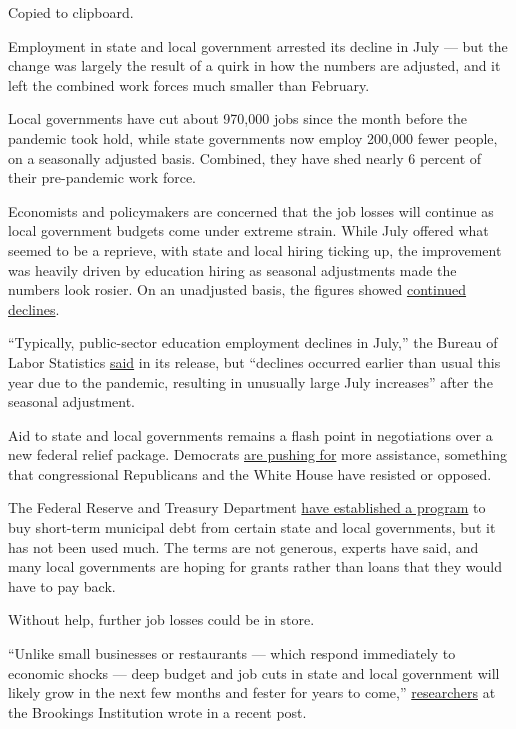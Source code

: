 Copied to clipboard.

Employment in state and local government arrested its decline in July
--- but the change was largely the result of a quirk in how the numbers
are adjusted, and it left the combined work forces much smaller than
February.

Local governments have cut about 970,000 jobs since the month before the
pandemic took hold, while state governments now employ 200,000 fewer
people, on a seasonally adjusted basis. Combined, they have shed nearly
6 percent of their pre-pandemic work force.

Economists and policymakers are concerned that the job losses will
continue as local government budgets come under extreme strain. While
July offered what seemed to be a reprieve, with state and local hiring
ticking up, the improvement was heavily driven by education hiring as
seasonal adjustments made the numbers look rosier. On an unadjusted
basis, the figures showed
\href{https://fred.stlouisfed.org/series/CEU9093000001}{continued
declines}.

``Typically, public-sector education employment declines in July,'' the
Bureau of Labor Statistics
\href{https://www.bls.gov/news.release/empsit.nr0.htm}{said} in its
release, but ``declines occurred earlier than usual this year due to the
pandemic, resulting in unusually large July increases'' after the
seasonal adjustment.

Aid to state and local governments remains a flash point in negotiations
over a new federal relief package. Democrats
\href{https://www.nytimes.com/2020/08/05/us/politics/congress-coronavirus-stimulus.html}{are
pushing for} more assistance, something that congressional Republicans
and the White House have resisted or opposed.

The Federal Reserve and Treasury Department
\href{https://www.nytimes.com/2020/08/06/business/house-democrats-want-fed-to-give-cities-and-states-more-help-by-improving-program-terms.html}{have
established a program} to buy short-term municipal debt from certain
state and local governments, but it has not been used much. The terms
are not generous, experts have said, and many local governments are
hoping for grants rather than loans that they would have to pay back.

Without help, further job losses could be in store.

``Unlike small businesses or restaurants --- which respond immediately
to economic shocks --- deep budget and job cuts in state and local
government will likely grow in the next few months and fester for years
to come,''
\href{https://www.brookings.edu/blog/the-avenue/2020/08/03/state-and-local-governments-employ-the-highest-share-of-essential-workers-congress-is-failing-to-protect-them/}{researchers}
at the Brookings Institution wrote in a recent post.

